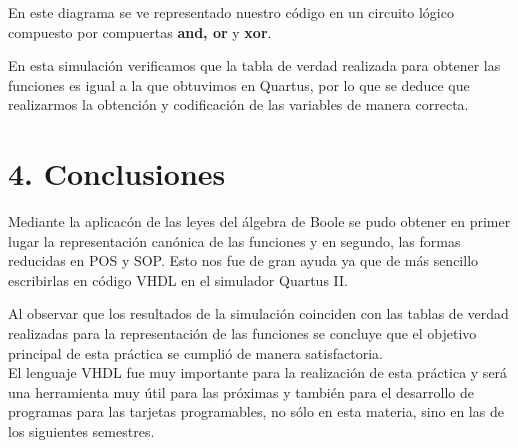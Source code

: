 \documentclass[letterpaper]{article} %
\begin{document}
            En este diagrama se ve representado nuestro c\'odigo en un circuito l\'ogico compuesto por compuertas
            \textbf{and, or} y \textbf{xor}.             

            \begin{figure}[H]
                \raggedright
            \end{figure}

            En esta simulaci\'on verificamos que la tabla de verdad realizada para obtener las funciones es
            igual a la que obtuvimos en Quartus, por lo que se deduce que realizarmos la obtenci\'on y 
            codificaci\'on de las variables de manera correcta.

    \section*{4. Conclusiones}

    Mediante la aplicac\'on de las leyes del \'algebra de Boole se pudo obtener en primer lugar la representaci\'on can\'onica
    de las funciones y en segundo, las formas reducidas en POS y SOP. Esto nos fue de gran ayuda ya que de m\'as sencillo
    escribirlas en c\'odigo VHDL en el simulador Quartus II. 

    Al observar que los resultados de la simulación coinciden con las tablas de verdad realizadas para la representaci\'on de las funciones
    se concluye que el objetivo principal de esta pr\'actica se cumpli\'o de manera satisfactoria.  \\
    El lenguaje VHDL fue muy importante para la realizaci\'on de esta pr\'actica y ser\'a una herramienta muy \'util para las pr\'oximas y tambi\'en
    para el desarrollo de programas para las tarjetas programables, no s\'olo en esta materia, sino en las de los siguientes semestres.
\end{document}
